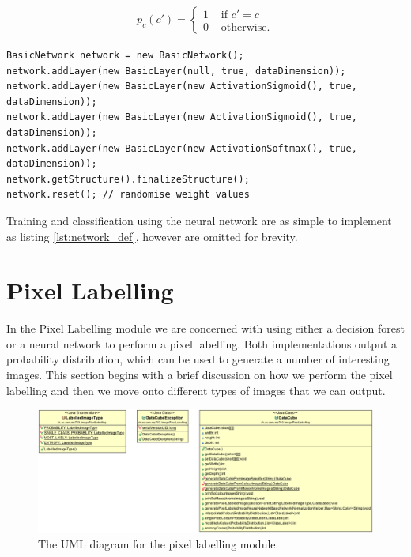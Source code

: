 \documentclass[12pt,twoside,notitlepage]{report}
\begin{document}
        \begin{align}
            p_c(c') = \begin{cases} 
                1 & \text{ if } c' = c \\
                0 & \text{ otherwise.}
            \end{cases}
        \end{align}

        \begin{lstlisting}[caption={[Simple construction of our neural network in Encog.]Simple construction of our neural network in Encog, where \texttt{dataDimension} is the number of spectral bins we have in spectra to classify and \texttt{noClasses} is the number of classes.},label={lst:network_def}]
BasicNetwork network = new BasicNetwork();
network.addLayer(new BasicLayer(null, true, dataDimension));
network.addLayer(new BasicLayer(new ActivationSigmoid(), true, dataDimension));
network.addLayer(new BasicLayer(new ActivationSigmoid(), true, dataDimension));
network.addLayer(new BasicLayer(new ActivationSoftmax(), true, dataDimension));
network.getStructure().finalizeStructure();
network.reset(); // randomise weight values
        \end{lstlisting}

        Training and classification using the neural network are as simple to implement as listing \ref{lst:network_def}, however are omitted for brevity.







    \section{Pixel Labelling}
        In the Pixel Labelling module we are concerned with using either a decision forest or a neural network to 
        perform a pixel labelling. Both implementations output a probability distribution, which can be used to 
        generate a number of interesting images. This section begins with a brief discussion on how we perform the 
        pixel labelling and then we move onto different types of images that we can output.

        \begin{figure}
            \centering
            \includegraphics[scale=0.3]{PixelLabel_UML}
            \caption{The UML diagram for the pixel labelling module.}
        \end{figure}
\end{document}
